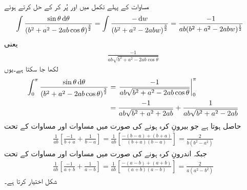 مساوات  کے پہلے تکمل میں  اور  پُر کر کے حل کرتے ہوئے
\begin{align}\label{مساوات_کولمب_کرہ_چارج_پہلا_تکمل_الف}
\int \frac{ \sin \theta \dif \theta}{ \left(b^2+a^2-2 ab \cos \theta \right)^{\frac{3}{2}}}&=\int \frac{-\dif w}{\left(b^2+a^2-2 ab w \right)^{\frac{3}{2}}}=\frac{-1}{ab (b^2+a^2-2abw)^{\frac{1}{2}}}
\end{align}
یعنی
\begin{align*}
\frac{-1}{ab \sqrt{b^2+a^2-2ab\cos \theta}}
\end{align*}
لکھا جا سکتا ہے۔یوں
\begin{gather}
\begin{aligned}
\int_0^{\pi} \frac{ \sin \theta \dif \theta}{ \left(b^2+a^2-2 ab \cos \theta \right)^{\frac{3}{2}}}&=\left. \frac{-1}{ab \sqrt{b^2+a^2-2ab\cos \theta}} \right|_{0}^{\pi}\\
&=\frac{-1}{ab \sqrt{b^2+a^2+2ab}}+\frac{1}{ab \sqrt{b^2+a^2-2ab}}
\end{aligned}
\end{gather}
حاصل ہوتا ہے جو  بیرونِ کرہ ہونے کی صورت میں مساوات  اور مساوات  کے تحت
\begin{align}\label{مساوات_کولمب_کرہ_کے_باہر_پہلا_تکمل}
\frac{1}{ab} \left[\frac{-1}{b+a}+\frac{1}{b-a} \right]=\frac{1}{ab} \left[\frac{-(b-a)+(b+a)}{(b+a)(b-a)}\right]=\frac{2}{b(b^2-a^2)}
\end{align}
جبکہ  اندرونِ کرہ ہونے کی صورت میں مساوات  اور مساوات  کے تحت
\begin{align}\label{مساوات_کولمب_کرہ_کے_اندر_پہلا_تکمل}
\frac{1}{ab} \left[\frac{-1}{a+b}+\frac{1}{a-b} \right]=\frac{1}{ab} \left[\frac{-(a-b)+(a+b)}{(a+b)(a-b)} \right]=\frac{2}{a(a^2-b^2)}
\end{align}
شکل اختیار کرتا ہے۔


